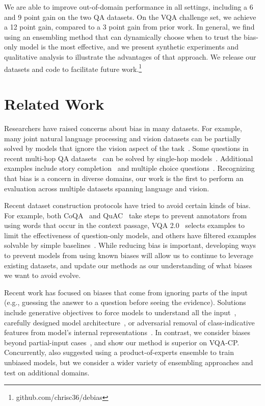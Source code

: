 \documentclass[11pt,a4paper]{article}
\begin{document}
We are able to improve out-of-domain performance in all settings, including a 6 and 9 point gain on the two QA datasets. 
On the VQA challenge set, we achieve a 12 point gain, compared to a 3 point gain from prior work.
In general, we find using an ensembling method that can dynamically choose when to trust the bias-only model is the most effective, and we present synthetic experiments and qualitative analysis to illustrate the advantages of that approach.
We release our datasets and code to facilitate future work.\footnote{github.com/chrisc36/debias} 
%
 
\section{Related Work}
Researchers have raised concerns about bias in many datasets. 
For example, many joint natural language processing and vision datasets can be partially solved by models that ignore the vision aspect of the task~\cite{jabri2016revisiting, zhang2016yin,anand2018blindfold,caglayan2019probing}.
Some questions in recent multi-hop QA datasets~\cite{hotpotqa,welbl2018constructing} can be solved by single-hop models~\cite{chen2019understanding,min2019compositional}.
Additional examples include story completion~\cite{schwartz2017effect} and multiple choice questions~\cite{clark2016combining,clark2018think}.
Recognizing that bias is a concern in diverse domains, our work is the first to perform an evaluation across multiple datasets spanning language and vision.


Recent dataset construction protocols have tried to avoid certain kinds of bias. For example, both CoQA~\cite{reddy2018coqa} and QuAC~\cite{choi2018quac} take steps to prevent annotators from using words that occur in the context passage, VQA 2.0~\cite{vqa2} selects examples to limit the effectiveness of question-only models, and others have filtered examples solvable by simple baselines~\cite{hotpotqa,record,clark2018think,swag}.
While reducing bias is important, developing ways to prevent models from using known biases will allow us to continue to leverage existing datasets, and update our methods as our understanding of what biases we want to avoid evolve.

Recent work has focused on biases that come from ignoring parts of the input (e.g., guessing the answer to a question before seeing the evidence).
Solutions include generative objectives to force models to understand all the input~\cite{generative_qa}, carefully designed model architecture~\cite{vqa_cp,zhang2016yin}, or adversarial removal of class-indicative features from model's internal representations~\cite{ramakrishnan2018overcoming,zhang2018mitigating,belinkov2019adversarial,grand2019adversarial}.
In contrast, we consider biases beyond partial-input cases~\cite{feng2019misleading}, and show our method is superior on VQA-CP.
Concurrently, \citet{HeHe} also suggested using a product-of-experts ensemble to train unbiased models, but we consider a wider variety of ensembling approaches and test on additional domains.
\end{document}
